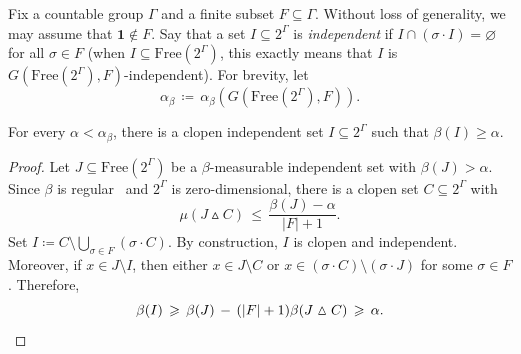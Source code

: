 \documentclass[AHL,Unicode,longabstracts,published]{cedram}
\newcommand{\0}{\varnothing}
\renewcommand{\leq}{\leqslant}
\renewcommand{\geq}{\geqslant}
\newcommand{\defeq}{\coloneqq}
\newcommand{\symdif}{\vartriangle}
\newcommand{\Free}{\mathrm{Free}}
\newcommand{\bfun}{\mathbf{1}}
\begin{document}
Fix a countable group $\Gamma$ and a finite subset $F \subseteq \Gamma$. Without loss of generality, we may assume that $\bfun \not \in F$. Say that a set $I \subseteq 2^\Gamma$ is \emph{independent} if $I \cap (\sigma \cdot I) = \0$ for all $\sigma \in F$ (when $I \subseteq \Free(2^\Gamma)$, this exactly means that $I$ is $G(\Free(2^\Gamma), F)$-independent). For brevity, let
\[
\alpha_\beta \,
\defeq\, \alpha_\beta\left(G\left(\Free\left(2^\Gamma\right), F\right)\right).
\]

\begin{lemm}\label{lemma:clopen}
For every $\alpha < \alpha_\beta$, there is a clopen independent set $I \subseteq 2^\Gamma$ such that $\beta(I) \geq \alpha$.
\end{lemm}


\begin{proof}
Let $J \subseteq \Free(2^\Gamma)$ be a $\beta$-measurable independent set with $\beta(J) > \alpha$. Since $\beta$ is regular~\cite[Theorem~17.10]{KechrisDST} and $2^\Gamma$ is zero-dimensional, there is a clopen set $C \subseteq 2^\Gamma$ with
\[
\mu(J \symdif C) \,\leq\, \frac{\beta(J) - \alpha}{|F| + 1}.
\]
Set $I
\defeq C \setminus \bigcup_{\sigma \in F} (\sigma \cdot C)$. By construction, $I$ is clopen and independent. Moreover, if $x \in J \setminus I$, then either $x \in J \setminus C$ or $x \in (\sigma \cdot C) \setminus (\sigma \cdot J)$ for some $\sigma \in F$. Therefore,
\[
\beta(I) \,\geq\, \beta(J) \,-\, (|F|+1) \beta(J \symdif C) \,\geq\, \alpha. \qedhere
\]
\end{proof}
\end{document}
